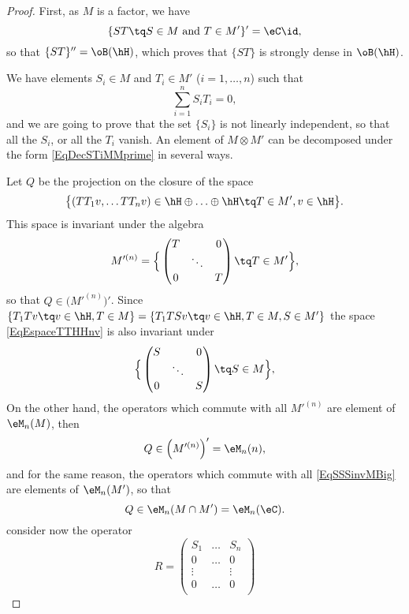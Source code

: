 \begin{proof}
First, as $M$ is a factor, we have
\[ 
  \{ ST\tq S\in M\text{ and }T\in M' \}'=\eC\id,
\]
so that $\{ ST \}''=\oB(\hH)$, which proves that $\{ ST \}$ is strongly dense in $\oB(\hH)$.

We have elements $S_i\in M$ and $T_i\in M'$ ($i=1,\ldots,n$) such that 
\begin{equation}		\label{EqDecSTiMMprime}
	\sum_{i=1}^nS_iT_i=0,
\end{equation}
and we are going to prove that the set $\{ S_i \}$ is not linearly independent, so that all the $S_i$, or all the $T_i$ vanish. An element of $M\otimes M'$ can be decomposed under the form \eqref{EqDecSTiMMprime} in several ways.

Let $Q$ be the projection on the closure of the space
\begin{equation}	\label{EqEspaceTTHHnv}
	\big\{    
		(TT_1v,\ldots TT_nv)\in\hH\oplus\ldots\oplus\hH\tq T\in M', v\in\hH
	\big\}.
\end{equation}
This space is invariant under the algebra
\begin{equation}
	M'^{(n)}=\Big\{ 
\begin{pmatrix}
T&&0\\
&\ddots\\
0&&T
\end{pmatrix}
\tq T\in M' \Big\},
\end{equation}
so that $Q\in\Big( M'^{(n)} \Big)'$. Since $\{ T_1Tv\tq v\in\hH, T\in M \}=\{ T_1TSv\tq v\in \hH,T\in M,S\in M' \}$ the space \eqref{EqEspaceTTHHnv} is also invariant under
\begin{equation}		\label{EqSSSinvMBig}
	\Big\{ 
\begin{pmatrix}
S&&0\\
&\ddots\\
0&&S
\end{pmatrix}
\tq S\in M \Big\},
\end{equation}
On the other hand, the operators which commute with all $M'^{(n)}$ are element of $\eM_n(M)$, then
\[ 
  Q\in\Big( M'^{(n)} \Big)'=\eM_n(n),
\]
and for the same reason, the operators which commute with all \eqref{EqSSSinvMBig} are elements of $\eM_n(M')$, so that
\[ 
  Q\in\eM_n(M\cap M')=\eM_n(\eC).
\]
consider now the operator
\[ 
  R=
\begin{pmatrix}
S_1&\ldots & S_n\\
0&\ldots & 0 \\
\vdots  &&\vdots\\
0&\ldots & 0 \\

\end{pmatrix}\]
\end{proof}

